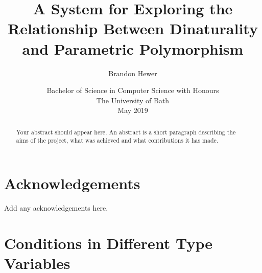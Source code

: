 \documentclass[11pt,openright,hidelinks,a4paper]{article}
\title{A System for Exploring the Relationship Between Dinaturality and Parametric Polymorphism}
\author{Brandon Hewer}
\date{Bachelor of Science in Computer Science with Honours\\The University of Bath\\May 2019}
\begin{document}
\maketitle

\newpage

\newpage


\newpage


\begin{abstract}
Your abstract should appear here.  An abstract is a short
paragraph describing the aims of the project, what was
achieved and what contributions it has made.
\end{abstract}
\newpage


\tableofcontents
\newpage
\listoffigures

\newpage

\section*{Acknowledgements}
Add any acknowledgements here.
\newpage

\setcounter{page}{1}


\newpage

\newpage

\newpage

\newpage

\newpage

\newpage

\newpage


\newpage



\newpage

\appendix

\section{Conditions in Different Type Variables}\label{app:differentvars}
\end{document}
